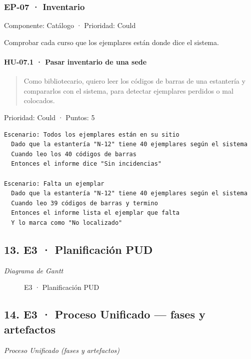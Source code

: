 \subsubsection*{EP-07 · Inventario}

Componente: Catálogo · Prioridad: Could

Comprobar cada curso que los ejemplares están donde dice el sistema.

\paragraph*{HU-07.1 · Pasar inventario de una sede}

\begin{quote}
Como bibliotecario, quiero leer los códigos de barras de una estantería y compararlos con el sistema, para detectar ejemplares perdidos o mal colocados.
\end{quote}

Prioridad: Could · Puntos: 5

\begin{Verbatim}[breaklines,fontsize=\small,frame=single,framerule=0.4pt,rulecolor=\color{black!25}]
Escenario: Todos los ejemplares están en su sitio
  Dado que la estantería "N-12" tiene 40 ejemplares según el sistema
  Cuando leo los 40 códigos de barras
  Entonces el informe dice "Sin incidencias"

Escenario: Falta un ejemplar
  Dado que la estantería "N-12" tiene 40 ejemplares según el sistema
  Cuando leo 39 códigos de barras y termino
  Entonces el informe lista el ejemplar que falta
  Y lo marca como "No localizado"
\end{Verbatim}

\subsection*{13. E3 · Planificación PUD}

\emph{Diagrama de Gantt}

\begin{figure}[H]
\centering
{}
\caption{E3 · Planificación PUD}
\end{figure}

\subsection*{14. E3 · Proceso Unificado — fases y artefactos}

\emph{Proceso Unificado (fases y artefactos)}

